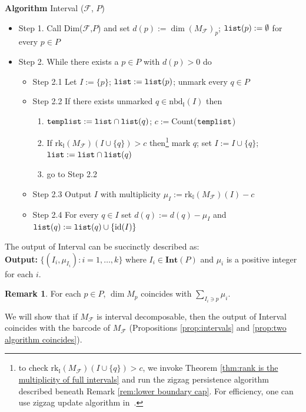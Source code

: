 \documentclass[11pt]{article}
\theoremstyle{definition}
\newtheorem{remark}[theorem]{Remark}
\newcommand{\intnbd}{\mathrm{nbd}_{\mathbb{I}}}
\newcommand{\intrk}{\mathrm{rk}_{\mathbb{I}}}
\newcommand{\Int}{\mathbf{Int}}
\newcommand{\Pb}{P}
\newcommand{\Fcal}{\mathcal{F}}
\begin{document}
\noindent
{\bf Algorithm} {\sc Interval} ($\mathcal F$, $\Pb$)\label{algorithm:interval}
\begin{itemize}
    \item Step 1. Call {\sc Dim}($\mathcal F$,$\Pb$) 
    and set $d(p):=\dim (M_{\mathcal F})_p$; ${\tt list}(p):=\emptyset$ for every $p\in \Pb$
    \item Step 2. While there exists a $p\in \Pb$ with $d(p)> 0$ do
    \begin{itemize}
        \item Step 2.1 Let $I:=\{p\}$; ${\tt list}:={\tt list}(p)$; unmark every $q\in \Pb$
        \item Step 2.2 If there exists unmarked $q\in \intnbd(I)$  then 
        \begin{enumerate}
            \item[i.] ${\tt templist}:={\tt list}\cap {\tt list}(q)$; $c:=${\sc Count}($\tt templist$)
           \item[ii.] If $\intrk(M_{\mathcal F})(I\cup\{q\})>c$ then\footnote{to check $\intrk(M_{\mathcal F})(I\cup\{q\})>c$, we invoke Theorem \ref{thm:rank is the multiplicity of full intervals} and run the zigzag persistence algorithm described beneath Remark \ref{rem:lower boundary cap}. For efficiency, one can use zigzag update algorithm in~\cite{DH21}.} 
             mark $q$; set $I:=I\cup \{q\}$; ${\tt list}:={\tt list}\cap {\tt list}(q)$ 
            \item[iii.] go to Step 2.2
        \end{enumerate}
        \item Step 2.3 Output $I$ with multiplicity $\mu_I:=\intrk(M_{\mathcal F})(I)-c$
        \item Step 2.4 For every $q\in I$ set $d(q):=d(q)-\mu_I$ and 
        ${\tt list}(q):={\tt list}(q)\cup \{\mathrm{id}(I)\}$
    \end{itemize}
\end{itemize}
The output of {\sc Interval} can be succinctly described as:\\
{\bf Output:} $\{(I_i,\mu_{I_i}):i=1,\ldots,k\}$ where $I_i\in\Int(\Pb)$ and $\mu_i$ is a positive integer for each $i$.

\begin{remark} For each $p\in \Pb$, $\dim M_p$ coincides with $\sum_{I_i\ni p} \mu_i$. 
\end{remark}

We will show that if $M_\Fcal$ is interval decomposable, then the output of {\sc Interval} coincides with the barcode 
of $M_{\Fcal}$ (Propositions \ref{prop:intervals} and \ref{prop:two algorithm coincides}). 
\end{document}
